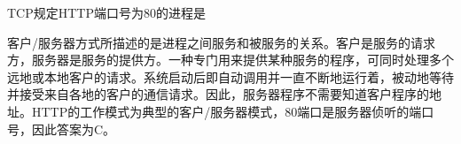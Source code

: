 \question TCP规定HTTP端口号为80的进程是
\par{}
\begin{solution}客户/服务器方式所描述的是进程之间服务和被服务的关系。客户是服务的请求方，服务器是服务的提供方。一种专门用来提供某种服务的程序，可同时处理多个远地或本地客户的请求。系统启动后即自动调用并一直不断地运行着，被动地等待并接受来自各地的客户的通信请求。因此，服务器程序不需要知道客户程序的地址。HTTP的工作模式为典型的客户/服务器模式，80端口是服务器侦听的端口号，因此答案为C。
\end{solution}
